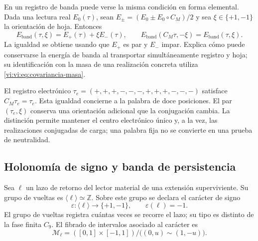 En un registro de banda puede verse la misma condición en forma
elemental. Dada una lectura real $E_0(\tau)$, sean
$E_\pm=(E_0\pm E_0\circ C_M)/2$ y sea $\xi\in\{+1,-1\}$
la orientación de hoja. Entonces
\begin{equation}
 E_{\mathrm{band}}(\tau,\xi)=E_+(\tau)+\xi E_-(\tau),\qquad
 E_{\mathrm{band}}(C_M\tau,-\xi)=E_{\mathrm{band}}(\tau,\xi).
 \label{vi:vi:eq:banda-paridad}
\end{equation}
La igualdad se obtiene usando que $E_+$ es par y $E_-$ impar.
Explica cómo puede conservarse la energía de banda al transportar
simultáneamente registro y hoja; su identificación con la masa de una
realización concreta utiliza \eqref{vi:vi:eq:covariancia-masa}.

El registro electrónico
$\tau_e=(+,+,+,-,-,-,+,+,+,-,-,-)$ satisface $C_M\tau_e=\tau_e$.
Esta igualdad concierne a la palabra de doce posiciones. El par
$(\tau_e,\xi)$ conserva una orientación adicional que la
conjugación cambia. La distinción permite mantener el centro
electrónico único y, a la vez, las realizaciones conjugadas de carga;
una palabra fija no se convierte en una prueba de neutralidad.

\subsection{Holonomía de signo y banda de persistencia}
\label{vi:vi:subsec:mobius}

Sea $\ell$ un lazo de retorno del lector material de una extensión
superviviente. Su grupo de vueltas es $\langle\ell\rangle\simeq
\mathbb Z$. Sobre este grupo se declara el carácter de signo
\begin{equation}
 \varepsilon:\langle\ell\rangle\longrightarrow\{+1,-1\},
 \qquad \varepsilon(\ell)=-1.
 \label{vi:vi:eq:holonomia-signo}
\end{equation}
El grupo de vueltas registra cuántas veces se recorre el lazo; su
tipo es distinto de la fase finita $C_9$. El fibrado de intervalos
asociado al carácter es
\begin{equation}
 \mathcal M_\ell=([0,1]\times[-1,1])/
                  \bigl((0,u)\sim(1,-u)\bigr).
 \label{vi:vi:eq:banda-mobius}
\end{equation}

